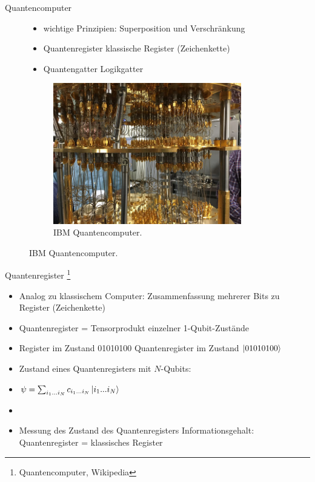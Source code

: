 \documentclass[aspectratio=1610, 9pt]{beamer}
\begin{document}
\begin{frame}{Quantencomputer}
  \begin{figure}
    \begin{minipage}{0.48\textwidth}
      \begin{itemize}
        \item wichtige Prinzipien: Superposition und Verschränkung
        \item Quantenregister \leftarrow \rightarrow klassische Register (Zeichenkette)
        \item Quantengatter \leftarrow \rightarrow Logikgatter
      \end{itemize}
    \end{minipage}
    \hfill
    \begin{minipage}{0.48\textwidth}
      \begin{figure}
        \includegraphics[width=0.9\textwidth]{images/Quantencomputer.jpg}
        \caption{IBM Quantencomputer. \footnotemark[15]}
      \end{figure}
    \end{minipage}
  \end{figure}


\end{frame}

\begin{frame}{Quantenregister \footnote[13]{Quantencomputer, Wikipedia}}
  \begin{itemize}
    \item Analog zu klassischem Computer: Zusammenfassung mehrerer Bits zu Register (Zeichenkette)
    \item[\rightarrow] Quantenregister = Tensorprodukt einzelner 1-Qubit-Zustände
    \item Register im Zustand 01010100 \rightarrow Quantenregister  im Zustand $\ket{01010100}$
    \item Zustand eines Quantenregisters mit $N$-Qubits:
    \item[] $\psi = \sum_{i_1 ...i_N} c_{i_1 ...i_N} \ket{i_1 ... i_N} $
    \item[]
    \item Messung des Zustand des Quantenregisters \rightarrow Informationsgehalt: Quantenregister = klassisches Register
  \end{itemize}
\end{frame}
\end{document}
